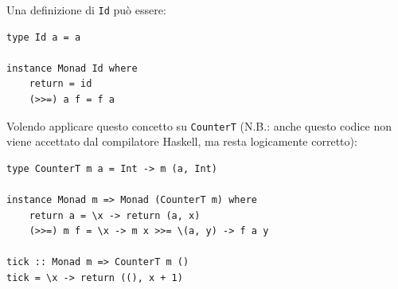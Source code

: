 \documentclass{article}
\begin{document}
Una definizione di \texttt{Id} può essere:
\begin{tcolorbox}
\begin{verbatim}
type Id a = a

instance Monad Id where
    return = id
    (>>=) a f = f a
\end{verbatim}
\end{tcolorbox}
\vspace{8pt}
Volendo applicare questo concetto su \texttt{CounterT} (N.B.: anche questo codice non viene accettato dal compilatore Haskell, ma resta logicamente corretto):
\begin{tcolorbox}
\begin{verbatim}
type CounterT m a = Int -> m (a, Int)

instance Monad m => Monad (CounterT m) where
    return a = \x -> return (a, x)
    (>>=) m f = \x -> m x >>= \(a, y) -> f a y

tick :: Monad m => CounterT m ()
tick = \x -> return ((), x + 1)
\end{verbatim}
\end{tcolorbox}
\end{document}
